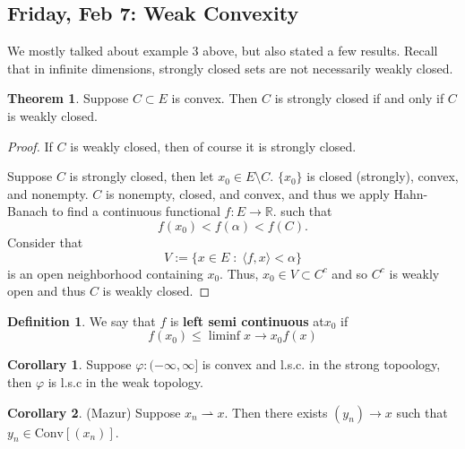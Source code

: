 \documentclass[10pt, oneside]{article}
\newcommand{\bbR}{\mathbb{R}}
\theoremstyle{definition}
\newtheorem{thm}{Theorem}
\newtheorem{defn}{Definition}
\newtheorem{cor}{Corollary}
\begin{document}
\newpage
\subsection{Friday, Feb 7: Weak Convexity}
We mostly talked about example $3$ above, but also stated a few results. Recall that in infinite dimensions, strongly closed sets are not necessarily weakly closed. 
\begin{thm}
    Suppose $C\subset E$ is convex. Then $C$ is strongly closed if and only if $C$ is weakly closed.
\end{thm}
\begin{proof}
    If $C$ is weakly closed, then of course it is strongly closed. 

    Suppose $C$ is strongly closed, then let $x_0 \in E\setminus C.$ $\{x_0\}$ is closed (strongly), convex, and nonempty. $C$ is nonempty, closed, and convex, and thus we apply Hahn-Banach to find a continuous functional $f: E \to \bbR.$ such that 
    \[f(x_0) < f(\alpha) < f(C).\] Consider that 
    \[V:= \{x\in E \; : \; \langle f, x \rangle < \alpha\}\] is an open neighborhood containing $x_0.$ Thus, $x_0 \in V \subset C^c$ and so $C^c$ is weakly open and thus $C$ is weakly closed.
\end{proof}
\begin{defn}
    We say that $f$ is \textbf{left semi continuous} at$x_0$ if \[f(x_0) \leq \liminf{x\to x_0} f(x)\]
\end{defn}
\begin{cor}
    Suppose $\varphi: (-\infty, \infty]$ is convex and l.s.c. in the strong topoology, then $\varphi$ is l.s.c in the weak topology.
\end{cor}
\begin{cor}
    (Mazur) Suppose $x_n \rightharpoonup x.$ Then there exists $(y_n)\to x$ such that $y_n \in \text{Conv}[(x_n)].$
\end{cor}

\newpage
\end{document}
